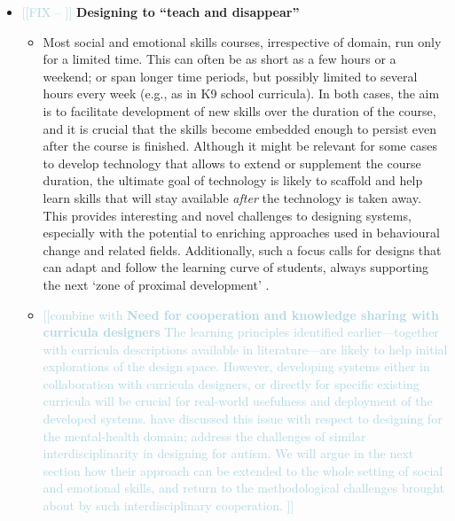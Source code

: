 \documentclass[prodmode,acmtochi]{acmsmall}
\newcommand{\todo}[1]{\textrm{\textrm{\textcolor{LightBlue}{[[#1]]} } } }
\begin{document}
\begin{itemize}
	\item \todo{FIX -- } {\bf Designing to ``teach and disappear''} 
	\begin{itemize}
		\item Most social and emotional skills courses, irrespective of domain, run only for a limited time. This can often be as short as a few hours or a weekend; or span longer time periods, but possibly limited to several hours every week (e.g., as in K9 school curricula). 
In both cases, the aim is to facilitate development of new skills over the duration of the course, and it is crucial that the skills become embedded enough to persist even after the course is finished.
Although it might be relevant for some cases to develop technology that allows to extend or supplement the course duration, the ultimate goal of technology is likely to scaffold and help learn skills that will stay available \emph{after} the technology is taken away. This provides interesting and novel challenges to designing systems, especially with the potential to enriching approaches used in behavioural change and related fields. Additionally, such a focus calls for designs that can adapt and follow the learning curve of students, always supporting the next `zone of proximal development' \cite{vygotsky1987collected}.
	\item \todo{combine with {\bf Need for cooperation and knowledge sharing with curricula designers}
        The learning principles identified earlier---together with curricula descriptions available in literature---are likely to help initial explorations of the design space. However, developing systems either in collaboration with curricula designers, or directly for specific existing curricula will be crucial for real-world usefulness and deployment of the developed systems. %
        \citeN{Coyle2007} have discussed this issue with respect to designing for the mental-health domain;  \citeN{Porayska-Pomsta2011} address the challenges of similar interdisciplinarity in designing for autism. We will argue in the next section how their approach can be extended to the whole setting of social and emotional skills, and return to the methodological challenges brought about by such interdisciplinary cooperation. }
	\end{itemize}


\end{itemize}
\end{document}
